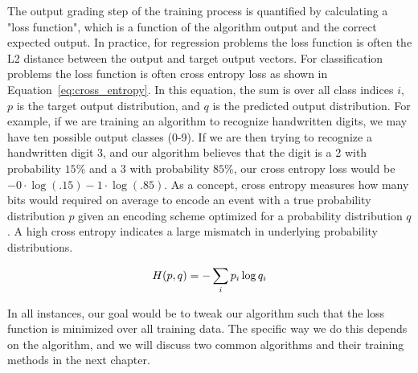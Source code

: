 The output grading step of the training process is quantified by calculating a "loss function", which is a function of the algorithm output and the correct expected output. In practice, for regression problems the loss function is often the L2 distance between the output and target output vectors. For classification problems the loss function is often cross entropy loss as shown in Equation~\ref{eq:cross_entropy}. In this equation, the sum is over all class indices $i$, $p$ is the target output distribution, and $q$ is the predicted output distribution. For example, if we are training an algorithm to recognize handwritten digits, we may have ten possible output classes (0-9). If we are then trying to recognize a handwritten digit 3, and our algorithm believes that the digit is a 2 with probability $15\%$ and a 3 with probability $85\%$, our cross entropy loss would be $-0\cdot\log(.15)-1\cdot\log(.85)$. As a concept, cross entropy measures how many bits would required on average to encode an event with a true probability distribution $p$ given an encoding scheme optimized for a probability distribution $q$. A high cross entropy indicates a large mismatch in underlying probability distributions.

\begin{equation}
\centering
H(p,q) = -\sum_{i} p_i \log q_i
\label{eq:cross_entropy}
\end{equation}

In all instances, our goal would be to tweak our algorithm such that the loss function is minimized over all training data. The specific way we do this depends on the algorithm, and we will discuss two common algorithms and their training methods in the next chapter.